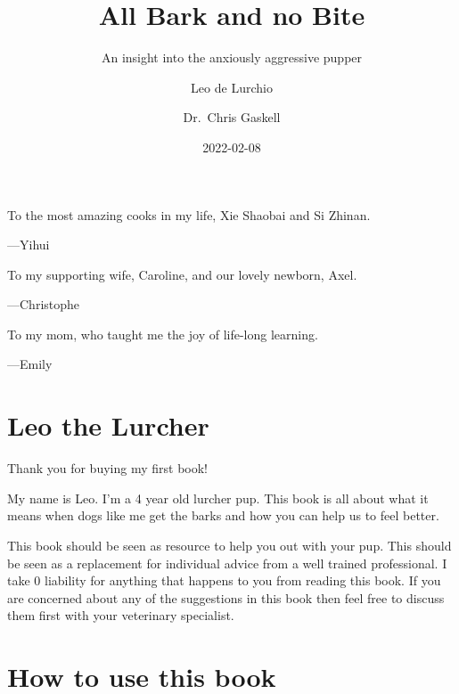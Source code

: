 \documentclass[
]{book}
\title{All Bark and no Bite}
\subtitle{An insight into the anxiously aggressive pupper}
\author{Leo de Lurchio \and Dr.~Chris Gaskell}
\date{2022-02-08}
\begin{document}
\maketitle

\cleardoublepage\newpage\thispagestyle{empty}\null
\cleardoublepage\newpage\thispagestyle{empty}\null
\thispagestyle{empty}
\begin{large}
To the most amazing cooks in my life, Xie Shaobai and Si Zhinan.
\begin{flushright}
---Yihui
\end{flushright}

\bigskip

To my supporting wife, Caroline, and our lovely newborn, Axel.
\begin{flushright}
---Christophe
\end{flushright}

\bigskip

To my mom, who taught me the joy of life-long learning.
\begin{flushright}
---Emily
\end{flushright}
\end{large}

\setlength{\abovedisplayskip}{-5pt}
\setlength{\abovedisplayshortskip}{-5pt}

{
\setcounter{tocdepth}{2}
\tableofcontents
}
\hypertarget{leo-the-lurcher}{%
\chapter*{Leo the Lurcher}\label{leo-the-lurcher}}


Thank you for buying my first book!

My name is Leo. I'm a 4 year old lurcher pup. This book is all about what it means when dogs like me get the barks and how you can help us to feel better.

This book should be seen as resource to help you out with your pup. This should be seen as a replacement for individual advice from a well trained professional. I take 0 liability for anything that happens to you from reading this book. If you are concerned about any of the suggestions in this book then feel free to discuss them first with your veterinary specialist.

\hypertarget{how-to-use-this-book}{%
\chapter*{How to use this book}\label{how-to-use-this-book}}
\end{document}
